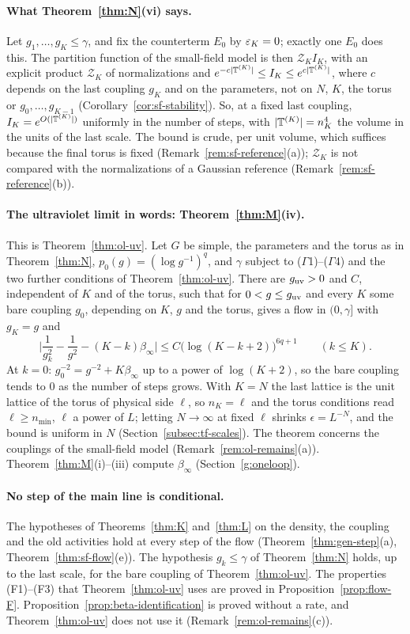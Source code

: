 \paragraph{What Theorem~\ref{thm:N}(vi) says.} Let $g_1,\dots,g_K\le\gamma$, and fix the counterterm $E_0$ by $\varepsilon_K=0$; exactly one $E_0$ does this. The partition function of the small-field model is then $\mathcal Z_KI_K$, with an explicit product $\mathcal Z_K$ of normalizations and $e^{-c|\mathbb T^{(K)}|}\le I_K\le e^{c|\mathbb T^{(K)}|}$, where $c$ depends on the last coupling $g_K$ and on the parameters, not on $N$, $K$, the torus or $g_0,\dots,g_{K-1}$ (Corollary~\ref{cor:sf-stability}). So, at a fixed last coupling, $I_K=e^{O(|\mathbb T^{(K)}|)}$ uniformly in the number of steps, with $|\mathbb T^{(K)}|=n_K^4$ the volume in the units of the last scale. The bound is crude, per unit volume, which suffices because the final torus is fixed (Remark~\ref{rem:sf-reference}(a)); $\mathcal Z_K$ is not compared with the normalizations of a Gaussian reference (Remark~\ref{rem:sf-reference}(b)).

\paragraph{The ultraviolet limit in words: Theorem~\ref{thm:M}(iv).} This is Theorem~\ref{thm:ol-uv}. Let $G$ be simple, the parameters and the torus as in Theorem~\ref{thm:N}, $p_0(g)=(\log g^{-1})^q$, and $\gamma$ subject to ($\Gamma$1)--($\Gamma$4) and the two further conditions of Theorem~\ref{thm:ol-uv}. There are $g_{\rm uv}>0$ and $C$, independent of $K$ and of the torus, such that for $0<g\le g_{\rm uv}$ and every $K$ some bare coupling $g_0$, depending on $K$, $g$ and the torus, gives a flow in $(0,\gamma]$ with $g_K=g$ and
\[
\Big|\frac1{g_k^2}-\frac1{g^2}-(K-k)\beta_\infty\Big|\le C\big(\log(K-k+2)\big)^{6q+1}\qquad(k\le K).
\]
At $k=0$: $g_0^{-2}=g^{-2}+K\beta_\infty$ up to a power of $\log(K+2)$, so the bare coupling tends to $0$ as the number of steps grows. With $K=N$ the last lattice is the unit lattice of the torus of physical side $\ell$, so $n_K=\ell$ and the torus conditions read $\ell\ge n_{\min}$, $\ell$ a power of $L$; letting $N\to\infty$ at fixed $\ell$ shrinks $\epsilon=L^{-N}$, and the bound is uniform in $N$ (Section~\ref{subsec:tf-scales}). The theorem concerns the couplings of the small-field model (Remark~\ref{rem:ol-remains}(a)). Theorem~\ref{thm:M}(i)--(iii) compute $\beta_\infty$ (Section~\ref{g:oneloop}).

\paragraph{No step of the main line is conditional.} The hypotheses of Theorems~\ref{thm:K} and~\ref{thm:L} on the density, the coupling and the old activities hold at every step of the flow (Theorem~\ref{thm:gen-step}(a), Theorem~\ref{thm:sf-flow}(e)). The hypothesis $g_k\le\gamma$ of Theorem~\ref{thm:N} holds, up to the last scale, for the bare coupling of Theorem~\ref{thm:ol-uv}. The properties (F1)--(F3) that Theorem~\ref{thm:ol-uv} uses are proved in Proposition~\ref{prop:flow-F}. Proposition~\ref{prop:beta-identification} is proved without a rate, and Theorem~\ref{thm:ol-uv} does not use it (Remark~\ref{rem:ol-remains}(c)).

